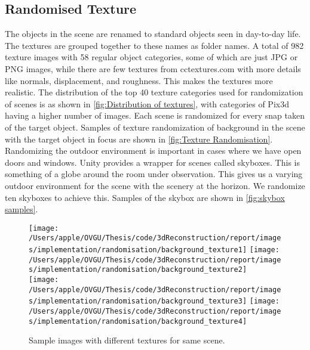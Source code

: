 \subsection{Randomised Texture}\label{subsec:randomised-texture}

The objects in the scene are renamed to standard objects seen in day-to-day life.
The textures are grouped together to these names as folder names.
A total of 982 texture images with 58 regular object categories, some of which are just JPG or PNG images, while there are few textures from cctextures.com with more details like normals, displacement, and roughness.
This makes the textures more realistic.
The distribution of the top 40 texture categories used for randomization of scenes is as shown in \autoref{fig:Distribution of textures}, with categories of Pix3d having a higher number of images.
Each scene is randomized for every snap taken of the target object.
Samples of texture randomization of background in the scene with the target object in focus are shown in \autoref{fig:Texture Randomisation}.
Randomizing the outdoor environment is important in cases where we have open doors and windows.
Unity provides a wrapper for scenes called skyboxes.
This is something of a globe around the room under observation.
This gives us a varying outdoor environment for the scene with the scenery at the horizon.
We randomize ten skyboxes to achieve this.
Samples of the skybox are shown in \autoref{fig:skybox samples}.


\begin{figure}
    \centering
    \texttt{[image: /Users/apple/OVGU/Thesis/code/3dReconstruction/report/images/implementation/randomisation/background\_texture1]}
    \texttt{[image: /Users/apple/OVGU/Thesis/code/3dReconstruction/report/images/implementation/randomisation/background\_texture2]}\\
    \vspace{0.1cm}
    \texttt{[image: /Users/apple/OVGU/Thesis/code/3dReconstruction/report/images/implementation/randomisation/background\_texture3]}
    \texttt{[image: /Users/apple/OVGU/Thesis/code/3dReconstruction/report/images/implementation/randomisation/background\_texture4]}\\
    \caption{Sample images with different textures for same scene.}
    \label{fig:Texture Randomisation}
\end{figure}


